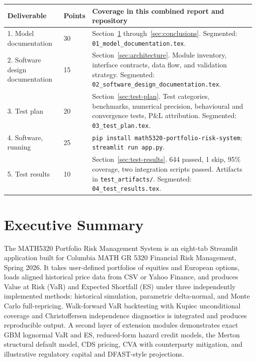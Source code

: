 \documentclass[11pt]{article}
\newcommand{\code}[1]{\texttt{#1}}
\begin{document}
\begin{center}
\small
\begin{longtable}{L{3.5cm}L{1.5cm}L{8cm}}
\toprule
\textbf{Deliverable} & \textbf{Points} & \textbf{Coverage in this combined report and repository} \\
. Model documentation
  & 30
  & Section~\ref{sec:exec-summary} through~\ref{sec:conclusions}.
    Segmented: \code{01\_model\_documentation.tex}. \\[4pt]
2. Software design documentation
  & 15
  & Section~\ref{sec:architecture}. Module inventory, interface contracts,
    data flow, and validation strategy.
    Segmented: \code{02\_software\_design\_\allowbreak documentation.tex}. \\[4pt]
3. Test plan
  & 20
  & Section~\ref{sec:test-plan}. Test categories, benchmarks, numerical
    precision, behavioural and convergence tests, P\&L attribution.
    Segmented: \code{03\_test\_plan.tex}. \\[4pt]
4. Software, running
  & 25
  & \code{pip install math5320-\allowbreak portfolio-risk-system};
    \code{streamlit run app.py}. \\[4pt]
5. Test results
  & 10
  & Section~\ref{sec:test-results}. 644 passed, 1 skip, 95\% coverage,
    two integration scripts passed. Artifacts in \code{test\_artifacts/}.
    Segmented: \code{04\_test\_results.tex}. \\
\bottomrule
\end{longtable}
\end{center}

\section{Executive Summary}
\label{sec:exec-summary}

The MATH5320 Portfolio Risk Management System is an eight-tab Streamlit
application built for Columbia MATH GR 5320 Financial Risk Management,
Spring 2026.  It takes user-defined portfolios of equities and European
options, loads aligned historical price data from CSV or Yahoo Finance,
and produces Value at Risk (VaR) and Expected Shortfall (ES) under three
independently implemented methods: historical simulation, parametric
delta-normal, and Monte Carlo full-repricing.  Walk-forward VaR
backtesting with Kupiec unconditional coverage and Christoffersen
independence diagnostics is integrated and produces reproducible output.
A second layer of extension modules demonstrates exact GBM lognormal VaR
and ES, reduced-form hazard credit models, the Merton structural default
model, CDS pricing, CVA with counterparty mitigation, and illustrative
regulatory capital and DFAST-style projections.
\end{document}
